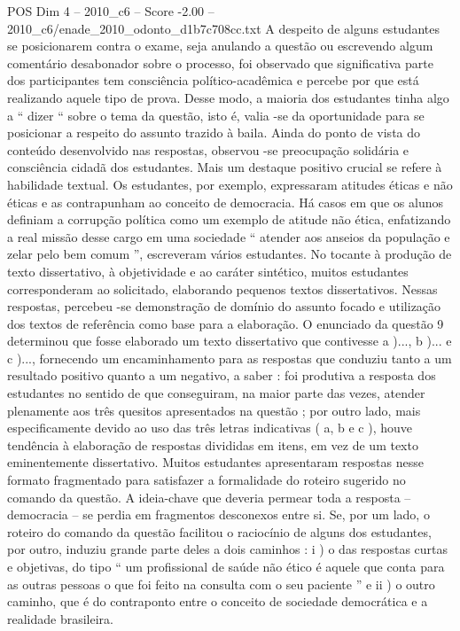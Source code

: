 \begin{textsample}{POS Dim 4 – 2010\_c6 – Score -2.00 – 2010\_c6/enade\_2010\_odonto\_d1b7c708cc.txt}
A despeito de alguns estudantes se posicionarem contra o exame, seja anulando a questão ou escrevendo algum comentário desabonador sobre o processo, foi observado que significativa parte dos participantes tem consciência político-acadêmica e percebe por que está realizando aquele tipo de prova.
Desse modo, a maioria dos estudantes tinha algo a “ dizer “ sobre o tema da questão, isto é, valia -se da oportunidade para se posicionar a respeito do assunto trazido à baila.
Ainda do ponto de vista do conteúdo desenvolvido nas respostas, observou -se preocupação solidária e consciência cidadã dos estudantes.
Mais um destaque positivo crucial se refere à habilidade textual.
Os estudantes, por exemplo, expressaram atitudes éticas e não éticas e as contrapunham ao conceito de democracia.
Há casos em que os alunos definiam a corrupção política como um exemplo de atitude não ética, enfatizando a real missão desse cargo em uma sociedade “ atender aos anseios da população e zelar pelo bem comum ”, escreveram vários estudantes.
No tocante à produção de texto dissertativo, à objetividade e ao caráter sintético, muitos estudantes corresponderam ao solicitado, elaborando pequenos textos dissertativos.
Nessas respostas, percebeu -se demonstração de domínio do assunto focado e utilização dos textos de referência como base para a elaboração.
O enunciado da questão 9 determinou que fosse elaborado um texto dissertativo que contivesse a )..., b )... e c )..., fornecendo um encaminhamento para as respostas que conduziu tanto a um resultado positivo quanto a um negativo, a saber : foi produtiva a resposta dos estudantes no sentido de que conseguiram, na maior parte das vezes, atender plenamente aos três quesitos apresentados na questão ; por outro lado, mais especificamente devido ao uso das três letras indicativas ( a, b e c ), houve tendência à elaboração de respostas divididas em itens, em vez de um texto eminentemente dissertativo.
Muitos estudantes apresentaram respostas nesse formato fragmentado para satisfazer a formalidade do roteiro sugerido no comando da questão.
A ideia-chave que deveria permear toda a resposta – democracia – se perdia em fragmentos desconexos entre si.
Se, por um lado, o roteiro do comando da questão facilitou o raciocínio de alguns dos estudantes, por outro, induziu grande parte deles a dois caminhos : i ) o das respostas curtas e objetivas, do tipo “ um profissional de saúde não ético é aquele que conta para as outras pessoas o que foi feito na consulta com o seu paciente ” e ii ) o outro caminho, que é do contraponto entre o conceito de sociedade democrática e a realidade brasileira.

\end{textsample}
